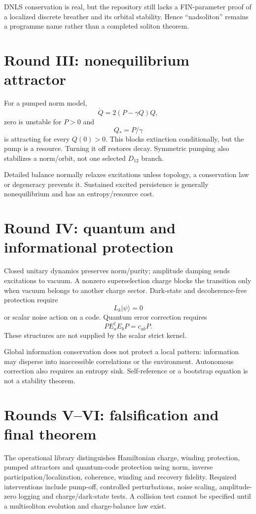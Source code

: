 \documentclass[11pt,a4paper]{article}
\begin{document}
DNLS conservation is real, but the repository still lacks a FIN-parameter proof of a localized discrete breather and its orbital stability. Hence ``nadsoliton'' remains a programme name rather than a completed soliton theorem.

\section{Round III: nonequilibrium attractor}
For a pumped norm model,
\[
\dot Q=2(P-\gamma Q)Q,
\]
zero is unstable for $P>0$ and
\[
Q_*=P/\gamma
\]
is attracting for every $Q(0)>0$. This blocks extinction conditionally, but the pump is a resource. Turning it off restores decay. Symmetric pumping also stabilizes a norm/orbit, not one selected $D_{12}$ branch.

Detailed balance normally relaxes excitations unless topology, a conservation law or degeneracy prevents it. Sustained excited persistence is generally nonequilibrium and has an entropy/resource cost.

\section{Round IV: quantum and informational protection}
Closed unitary dynamics preserves norm/purity; amplitude damping sends excitations to vacuum. A nonzero superselection charge blocks the transition only when vacuum belongs to another charge sector. Dark-state and decoherence-free protection require
\[
L_k|\psi\rangle=0
\]
or scalar noise action on a code. Quantum error correction requires
\[
P E_a^\dagger E_b P=c_{ab}P.
\]
These structures are not supplied by the scalar strict kernel.

Global information conservation does not protect a local pattern: information may disperse into inaccessible correlations or the environment. Autonomous correction also requires an entropy sink. Self-reference or a bootstrap equation is not a stability theorem.

\section{Rounds V--VI: falsification and final theorem}
The operational library distinguishes Hamiltonian charge, winding protection, pumped attractors and quantum-code protection using norm, inverse participation/localization, coherence, winding and recovery fidelity. Required interventions include pump-off, controlled perturbations, noise scaling, amplitude-zero logging and charge/dark-state tests. A collision test cannot be specified until a multisoliton evolution and charge-balance law exist.
\end{document}
